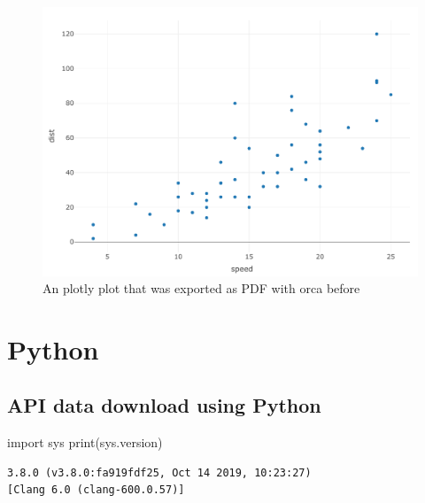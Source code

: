 \documentclass[
  12pt,
]{article}
\newenvironment{Shaded}{\begin{snugshade}}{\end{snugshade}}
\newcommand{\BuiltInTok}[1]{#1}
\newcommand{\ImportTok}[1]{#1}
\newcommand{\NormalTok}[1]{#1}
\begin{document}
\begin{figure}[ht]
\centering
\caption{An plotly plot that was exported as PDF with orca before}\label{fig:fig-3}
        \includegraphics[width=0.9\linewidth]{plotly-plot.pdf}
\begin{flushleft}
\end{flushleft}
\end{figure}
\vspace{-1.2cm}

\hypertarget{python}{%
\section{Python}\label{python}}

\hypertarget{api-data-download-using-python}{%
\subsection{API data download using Python}\label{api-data-download-using-python}}

\begin{Shaded}
\begin{Highlighting}[]
\ImportTok{import}\NormalTok{ sys}
\BuiltInTok{print}\NormalTok{(sys.version)}
\end{Highlighting}
\end{Shaded}

\begin{verbatim}
3.8.0 (v3.8.0:fa919fdf25, Oct 14 2019, 10:23:27) 
[Clang 6.0 (clang-600.0.57)]
\end{verbatim}
\end{document}
